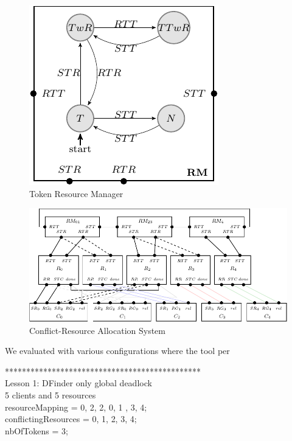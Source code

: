 \begin{figure}[ht]
\begin{center}
\includegraphics[scale=1.2]{compiledfigures/token-crop.pdf}
\caption{Token Resource Manager}
\label{fig:conflict-token}
\end{center}
\end{figure}

\begin{figure}[ht]
\begin{center}
\includegraphics[scale=1.2]{compiledfigures/resourceallocation-crop.pdf}
\caption{Conflict-Resource Allocation System}
\label{fig:resourceallocation}
\end{center}
\end{figure}

We evaluated \deadlocktool{} with various configurations where the tool per

**********************************************\\
Lesson 1: DFinder only global deadlock \\
5 clients and 5 resources \\
resourceMapping = {{0, 2}, {2, 0}, {1} , {3}, {4}};\\
conflictingResources = {{0, 1}, {2, 3}, {4}};\\
nbOfTokens = 3;\\\\


